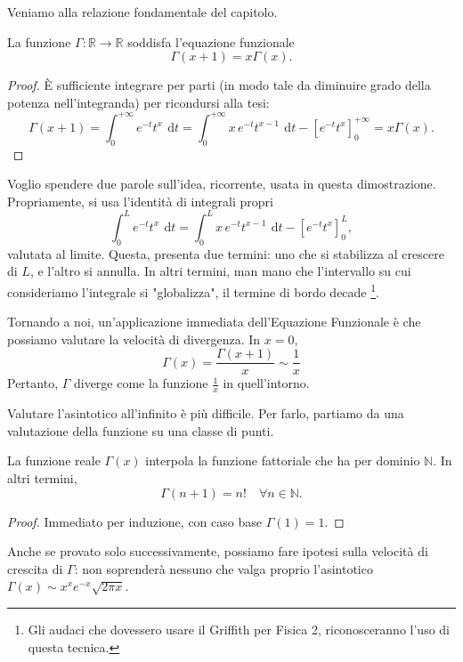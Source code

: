 Veniamo alla relazione fondamentale del capitolo. 
\begin{Res}
\label{eq_fun_gamma}
La funzione $ \Gamma: \mathbb{R} \to \mathbb{R}$ soddisfa l'equazione funzionale
	\begin{equation*}
		\Gamma(x+1)=
		x \Gamma(x).
	\end{equation*}
\end{Res}
\begin{proof}
È sufficiente integrare per parti (in modo tale da diminuire grado della potenza nell'integranda) per ricondursi alla tesi:
	\begin{equation*}
		\Gamma(x+1)= \int^{+ \infty}_0 e^{-t}t^x \: \, \mathrm{d}t =
		\int^{+ \infty}_0 x \, e^{-t}t^{x-1} \: \, \mathrm{d}t - \left[e^{-t}t^x \right]^{+ \infty}_0 =
		x \Gamma(x).
	\end{equation*}
\end{proof}
Voglio spendere due parole sull'idea, ricorrente, usata in questa dimostrazione. 
Propriamente, si usa l'identità di integrali propri
\begin{equation*}
	\int^L_0 e^{-t} t^x \: \, \mathrm{d}t = 
	\int^L_0 x \, e^{-t} t^{x-1} \: \, \mathrm{d}t - \left[e^{-t} t^x \right]^L_0,
\end{equation*}
valutata al limite. 
Questa, presenta due termini: uno che si stabilizza al crescere di $L$, e l'altro si annulla. 
In altri termini, man mano che l'intervallo su cui consideriamo l'integrale si "globalizza", il termine di bordo decade \footnote{Gli audaci che dovessero usare il Griffith per Fisica 2, riconosceranno l'uso di questa tecnica.}.

Tornando a noi, un'applicazione immediata dell'Equazione Funzionale è che possiamo valutare la velocità di divergenza.
In $x=0$,
\begin{equation*}
	\Gamma(x)= \frac{ \Gamma(x+1)}{x} \sim \frac{1}{x}
\end{equation*}
Pertanto, $ \Gamma$ diverge come la funzione $ \frac{1}{x}$ in quell'intorno. 

Valutare l'asintotico all'infinito è più difficile. 
Per farlo, partiamo da una valutazione della funzione su una classe di punti.

\begin{Res} 
La funzione reale $ \Gamma(x)$ interpola la funzione fattoriale che ha per dominio $ \mathbb{N}$. 
In altri termini,
	\begin{equation*}
		\Gamma(n+1)=n! \quad \forall n \in \mathbb{N}.
	\end{equation*}
\end{Res}
\begin{proof}
Immediato per induzione, con caso base $ \Gamma(1)=1$.
\end{proof}
Anche se provato solo successivamente, possiamo fare ipotesi sulla velocità di crescita di $ \Gamma$: non soprenderà nessuno che valga proprio l'asintotico $ \Gamma(x) \sim x^x e^{-x} \sqrt{2 \pi x}$.


